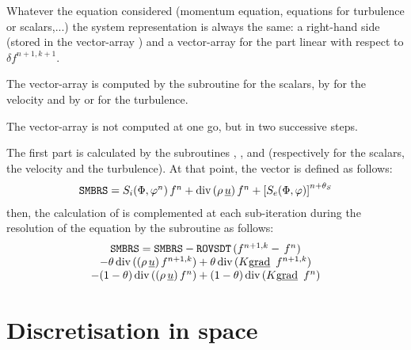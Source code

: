 Whatever the equation considered (momentum equation, equations for
turbulence or scalars,...) the system representation is always the same: a
right-hand side (stored in the vector-array ) and a vector-array %
 for the part linear with respect to $\delta f^{n+1,k+1}$.%
\newline

\begin{description}
\item The vector-array  is computed by the subroutine %
 for the scalars, by  for the velocity and by %
 or  for the turbulence.

\item The vector-array  is not computed at one go, but in two
successive steps.\newline
\end{description}

The first part is calculated by the subroutines , %
,  and  (respectively for the scalars, the
velocity and the turbulence). At that point, the vector  is
defined as follows:
\begin{equation}
\begin{array}{c}
\var{SMBRS}=S_{i}(\Phi ,\varphi ^{n})\,f^{n}+\dive\,(\rho \,\underline{u}%
)\,f^{n}+\left[ S_{e}(\Phi ,\varphi )\right] ^{n+\theta _{S}}%
\end{array}%
\end{equation}%
then, the calculation of  is complemented at each sub-iteration
during the resolution of the equation by the subroutine  as
follows:
\begin{equation}
\begin{array}{c}
\var{SMBRS}=\var{SMBRS}-\var{ROVSDT}\,(f^{n+1,k}-\,f^{n}) \\
-\theta \,\dive\,((\rho \,\underline{u})\,f^{n+1,k})+\theta \,\dive\,(K\grad%
\,f^{n+1,k}) \\
-(1-\theta )\,\dive\,((\rho \,\underline{u})\,f^{n})+(1-\theta )\,\dive\,(K%
\grad\,f^{n})%
\end{array}%
\end{equation}

\newpage %

\section{Discretisation in space}

